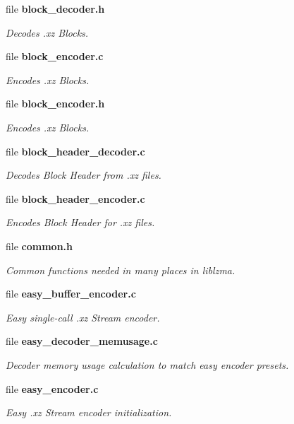 \begin{DoxyCompactItemize}
file \textbf{ block\+\_\+decoder.\+h}
\begin{DoxyCompactList}\small\item\em Decodes .xz Blocks. \end{DoxyCompactList}\item 
file \textbf{ block\+\_\+encoder.\+c}
\begin{DoxyCompactList}\small\item\em Encodes .xz Blocks. \end{DoxyCompactList}\item 
file \textbf{ block\+\_\+encoder.\+h}
\begin{DoxyCompactList}\small\item\em Encodes .xz Blocks. \end{DoxyCompactList}\item 
file \textbf{ block\+\_\+header\+\_\+decoder.\+c}
\begin{DoxyCompactList}\small\item\em Decodes Block Header from .xz files. \end{DoxyCompactList}\item 
file \textbf{ block\+\_\+header\+\_\+encoder.\+c}
\begin{DoxyCompactList}\small\item\em Encodes Block Header for .xz files. \end{DoxyCompactList}\item 
file \textbf{ common.\+h}
\begin{DoxyCompactList}\small\item\em Common functions needed in many places in liblzma. \end{DoxyCompactList}\item 
file \textbf{ easy\+\_\+buffer\+\_\+encoder.\+c}
\begin{DoxyCompactList}\small\item\em Easy single-\/call .xz Stream encoder. \end{DoxyCompactList}\item 
file \textbf{ easy\+\_\+decoder\+\_\+memusage.\+c}
\begin{DoxyCompactList}\small\item\em Decoder memory usage calculation to match easy encoder presets. \end{DoxyCompactList}\item 
file \textbf{ easy\+\_\+encoder.\+c}
\begin{DoxyCompactList}\small\item\em Easy .xz Stream encoder initialization. \end{DoxyCompactList}\item 

\end{DoxyCompactItemize}

